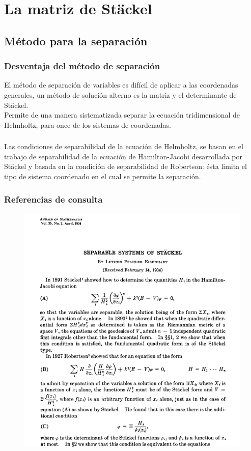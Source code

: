 \documentclass[12pt]{beamer}
\begin{document}
\section{La matriz de Stäckel}
\subsection{Método para la separación}

\begin{frame}
\frametitle{Desventaja del método de separación}
El método de separación de variables es difícil de aplicar a las coordenadas generales, \pause un método de solución alterno es la matriz y el determinante de Stäckel.
\\
\bigskip
\pause
Permite de una manera sistematizada separar la ecuación tridimensional de Helmholtz, para once de los sistemas de coordenadas.
\end{frame}
\begin{frame}
\frametitle{}
Las condiciones de separabilidad de la ecuación de Helmholtz, se basan en el trabajo de separabilidad de la ecuación de Hamilton-Jacobi desarrollada por Stäckel y basada en la condición de separabilidad de Robertson: ésta limita el tipo de sistema coordenado en el cual se permite la separación.
\end{frame}
\begin{frame}
\frametitle{Referencias de consulta}
\begin{figure}
  \centering
  \includegraphics[scale=0.4]{Imagenes/Referencia_Eisenhart.png}
\end{figure}
\end{frame}
\end{document}
